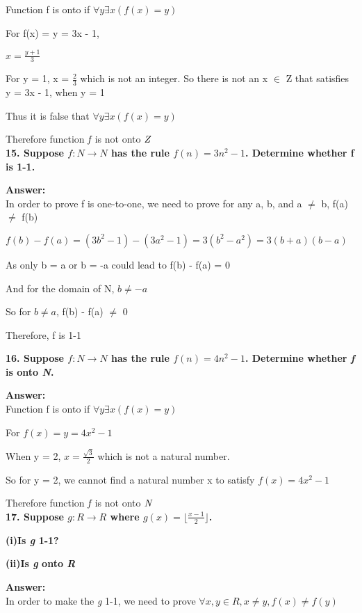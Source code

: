 \documentclass{article}
\begin{document}
\begin{large}
Function f is onto if $\forall y \exists x (f(x) = y)$

For f(x) = y = 3x - 1, 

$x = \frac{y+1}{3}$

For y = 1, x = $\frac{2}{3}$ which is not an integer. So there is not an x $\in$ Z that satisfies y = 3x - 1, when y = 1

Thus it is false that $\forall y \exists x (f(x) = y)$

Therefore function $\emph{f}$ is not onto $\emph{Z}$\\


\textbf{15. Suppose $f:N\to N$ has the rule $f(n)=3{n^{2}}-1$. Determine whether f is 1-1.}

\textbf{Answer:} \\

In order to prove f is one-to-one, we need to prove for any a, b, and a $\neq$ b, f(a) $\neq$ f(b)

$f(b) - f(a) = (3b^2 - 1) - (3a^2 - 1) = 3(b^2 - a^2) = 3(b + a)(b - a)$

As only b = a or b = -a could lead to f(b) - f(a) = 0

And for the domain of N, $b \neq -a$

So for $b \neq a$, f(b) - f(a) $\neq$ 0

Therefore, f is 1-1


\textbf{16. Suppose $f:N\to N$ has the rule $f(n)=4n^2-1$. Determine whether \emph{f} is onto \emph{N}.}

\textbf{Answer:} \\

Function f is onto if $\forall y \exists x (f(x) = y)$

For $f(x) = y = 4x^2 - 1$

When y = 2, $x = \frac{\sqrt 3}{2}$ which is not a natural number.

So for y = 2, we cannot find a natural number x to satisfy $f(x) = 4x^2 - 1$

Therefore function $\emph{f}$ is not onto $\emph{N}$\\


\textbf{17. Suppose $g:R\to R$ where $g(x)=\lfloor \frac{x-1}{2}\rfloor$.}

\textbf{(i)Is \emph{g} 1-1?}

\textbf{(ii)Is \emph{g} onto \emph{R}}

\textbf{Answer:} \\

In order to make the \emph{g} 1-1, we need to prove $\forall x, y \in R, x \neq y, f(x) \neq f(y)$


\end{large}
\end{document}
